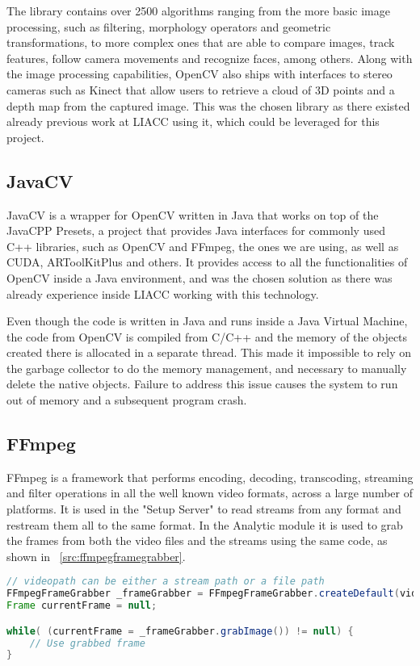 The library contains over 2500 algorithms ranging from the more basic image processing, such as filtering, morphology operators and geometric transformations, to more complex ones that are able to compare images, track features, follow camera movements and recognize faces, among others. Along with the image processing capabilities, OpenCV also ships with interfaces to stereo cameras such as Kinect that allow users to retrieve a cloud of 3D points and a depth map from the captured image. This was the chosen library as there existed already previous work at LIACC using it, which could be leveraged for this project.

\subsection{JavaCV}
JavaCV is a wrapper for OpenCV written in Java that works on top of the JavaCPP Presets, a project that provides Java interfaces for commonly used C++ libraries, such as OpenCV and FFmpeg, the ones we are using, as well as CUDA, ARToolKitPlus and others. It provides access to all the functionalities of OpenCV inside a Java environment, and was the chosen solution as there was already experience inside LIACC working with this technology.

Even though the code is written in Java and runs inside a Java Virtual Machine, the code from OpenCV is compiled from C/C++ and the memory of the objects created there is allocated in a separate thread. This made it impossible to rely on the garbage collector to do the memory management, and necessary to manually delete the native objects. Failure to address this issue causes the system to run out of memory and a subsequent program crash.

\subsection{FFmpeg}
FFmpeg is a framework that performs encoding, decoding, transcoding, streaming and filter operations in all the well known video formats, across a large number of platforms. It is used in the "Setup Server" to read streams from any format and restream them all to the same format. In the Analytic module it is used to grab the frames from both the video files and the streams using the same code, as shown in ~\ref{src:ffmpegframegrabber}.

\begin{lstlisting}[float,language=Java, label={src:ffmpegframegrabber}, caption=FFmpegFrameGrabber usage example] 
// videopath can be either a stream path or a file path
FFmpegFrameGrabber _frameGrabber = FFmpegFrameGrabber.createDefault(videopath);
Frame currentFrame = null;

while( (currentFrame = _frameGrabber.grabImage()) != null) {
	// Use grabbed frame
}
\end{lstlisting}

